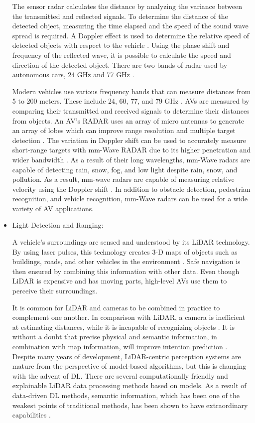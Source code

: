 \documentclass[a4paper,12pt]{article}
\begin{document}
\begin{itemize}
  \hspace{5mm} The sensor radar calculates the distance by analyzing the variance between the transmitted and reflected signals. To determine the distance of the detected object, measuring the time elapsed and the speed of the sound wave spread is required. A Doppler effect is used to determine the relative speed of detected objects with respect to the vehicle \cite{article26}. Using the phase shift and frequency of the reflected wave, it is possible to calculate the speed and direction of the detected object. There are two bands of radar used by autonomous cars, 24 GHz and 77 GHz \cite{article26}.
  
  \hspace{5mm} Modern vehicles use various frequency bands that can measure distances from 5 to 200 meters. These include 24, 60, 77, and 79 GHz \cite{article24}. AVs are measured by comparing their transmitted and received signals to determine their distances from objects. An AV's RADAR uses an array of micro antennas to generate an array of lobes which can improve range resolution and multiple target detection \cite{article24}. The variation in Doppler shift can be used to accurately measure short-range targets with mm-Wave RADAR due to its higher penetration and wider bandwidth \cite{article24}. As a result of their long wavelengths, mm-Wave radars are capable of detecting rain, snow, fog, and low light despite rain, snow, and pollution. As a result, mm-wave radars are capable of measuring relative velocity using the Doppler shift \cite{article24}. In addition to obstacle detection, pedestrian recognition, and vehicle recognition, mm-Wave radars can be used for a wide variety of AV applications.

  \item Light Detection and Ranging:

\hspace{5mm} A vehicle's surroundings are sensed and understood by its LiDAR technology. By using laser pulses, this technology creates 3-D maps of objects such as buildings, roads, and other vehicles in the environment \cite{article27}. Safe navigation is then ensured by combining this information with other data. Even though LiDAR is expensive and has moving parts, high-level AVs use them to perceive their surroundings.

\hspace{5mm} It is common for LiDAR and cameras to be combined in practice to complement one another. In comparison with LiDAR, a camera is inefficient at estimating distances, while it is incapable of recognizing objects \cite{article27}. It is without a doubt that precise physical and semantic information, in combination with map information, will improve intention prediction \cite{article27}. Despite many years of development, LiDAR-centric perception systems are mature from the perspective of model-based algorithms, but this is changing with the advent of DL. There are several computationally friendly and explainable LiDAR data processing methods based on models. As a result of data-driven DL methods, semantic information, which has been one of the weakest points of traditional methods, has been shown to have extraordinary capabilities \cite{article27}.


\end{itemize}
\end{document}
